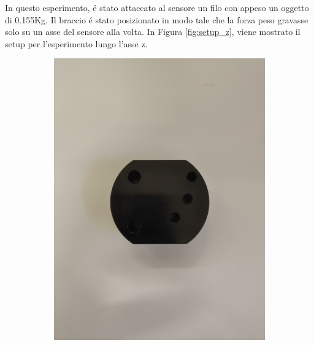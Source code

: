 In questo esperimento, \'{e} stato attaccato al sensore un filo con appeso un oggetto di 0.155Kg. 
Il braccio \'{e} stato posizionato in modo tale che la forza peso gravasse solo su un asse del sensore alla volta. 
In Figura \ref{fig:setup_z}, viene mostrato il setup per l'esperimento lungo l'asse z. 
\begin{figure}[H]
    \centering
    \begin{subfigure}[b]{0.4\textwidth}
        \includegraphics[width=\textwidth]{images/object.jpg}
        \label{fig:welding}
    \end{subfigure}
    \qquad
    \begin{subfigure}[b]{0.4\textwidth}

\end{subfigure}
\end{figure}
